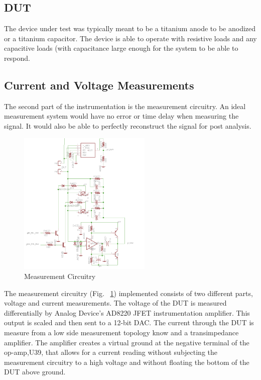 \documentclass[journal]{IEEEtran}
\begin{document}
\subsection{DUT}

The device under test was typically meant to be a titanium anode to be anodized or a titanium capacitor. The device is able to operate with resistive loads and any capacitive loads (with capacitance large enough for the system to be able to respond.


\subsection{Current and Voltage Measurements}

The second part of the instrumentation is the measurement circuitry. An ideal measurement system would have no error or time delay when measuring the signal. It would also be able to perfectly reconstruct the signal for post analysis. 
 

\begin{figure}[here]
\centering
\includegraphics[width=2.5in]{measCir}
\caption{Measurement Circuitry}
\label{fig:measCir}
\end{figure}

The measurement circuitry (Fig. ~\ref{fig:measCir}) implemented consists of two different parts, voltage and current measurements. The voltage of the DUT is measured differentially by Analog Device’s AD8220 JFET instrumentation amplifier. This output is scaled and then sent to a 12-bit DAC. The current through the DUT is measure from a low side measurement topology know and a transimpedance amplifier. The amplifier creates a virtual ground at the negative terminal of the op-amp,U39, that allows for a current reading without subjecting the measurement circuitry to a high voltage and without floating the bottom of the DUT above ground.
\end{document}
